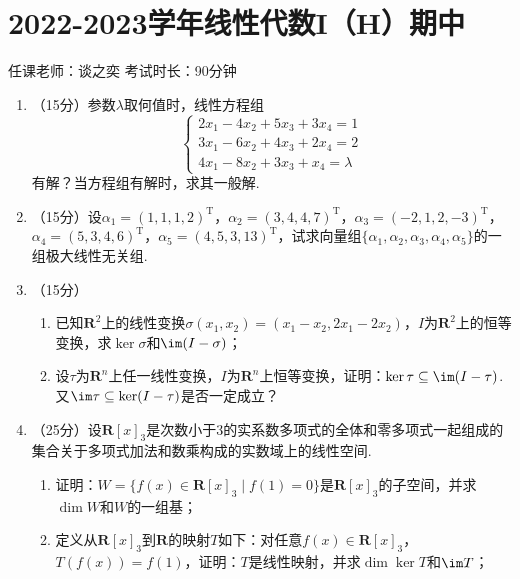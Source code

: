 \section{2022-2023学年线性代数I（H）期中}

\begin{center}
    任课老师：谈之奕\hspace{4em} 考试时长：90分钟
\end{center}
\begin{enumerate}
    \item （15分）参数$\lambda$取何值时，线性方程组
    \[\begin{cases}
        2x_1-4x_2+5x_3+3x_4=1 \\
           3x_1-6x_2+4x_3+2x_4=2 \\
           4x_1-8x_2+3x_3+x_4=\lambda
    \end{cases}\]
    有解？当方程组有解时，求其一般解.

    \item （15分）设$\alpha_1=(1,1,1,2)^\mathrm{T}$，$\alpha_2=(3,4,4,7)^\mathrm{T}$，$\alpha_3=(-2,1,2,-3)^\mathrm{T}$，$\alpha_4=(5,3,4,6)^\mathrm{T}$，$\alpha_5=(4,5,3,13)^\mathrm{T}$，试求向量组$\{\alpha_1,\alpha_2,\alpha_3,\alpha_4,\alpha_5\}$的一组极大线性无关组.

    \item （15分）
    \begin{enumerate}
        \item 已知$\mathbf{R}^2$上的线性变换$\sigma(x_1,x_2)=(x_1-x_2,2x_1-2x_2)$，$I$为$\mathbf{R}^2$上的恒等变换，求$\ker\sigma$和$\im(I-\sigma)$；

        \item 设$\tau$为$\mathbf{R}^n$上任一线性变换，$I$为$\mathbf{R}^n$上恒等变换，证明：$\ker\tau\subseteq\im(I-\tau)$. 又$\im\tau\subseteq\ker(I-\tau)$是否一定成立？
    \end{enumerate}

    \item （25分）设$\mathbf{R}[x]_3$是次数小于3的实系数多项式的全体和零多项式一起组成的集合关于多项式加法和数乘构成的实数域上的线性空间.
    \begin{enumerate}
        \item 证明：$W=\{f(x)\in\mathbf{R}[x]_3\mid f(1)=0\}$是$\mathbf{R}[x]_3$的子空间，并求$\dim W$和$W$的一组基；

        \item 定义从$\mathbf{R}[x]_3$到$\mathbf{R}$的映射$T$如下：对任意$f(x)\in\mathbf{R}[x]_3$，$T(f(x))=f(1)$，证明：$T$是线性映射，并求$\dim\ker T$和$\im T$；


\end{enumerate}
\end{enumerate}
